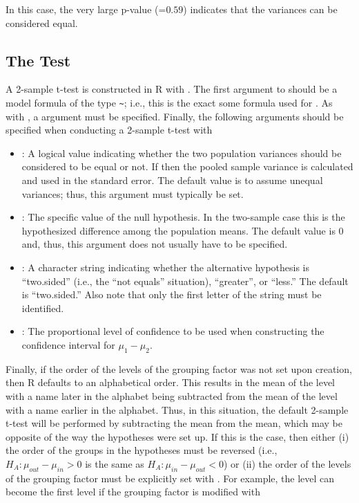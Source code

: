 \documentclass[10pt,openany]{book}\usepackage[]{graphicx}\usepackage[]{color}
\begin{document}
In this case, the very large p-value (=$0.59$) indicates that the variances can be considered equal.


\subsection{The Test}
A 2-sample t-test is constructed in R with .  The first argument to  should be a model formula of the type \verb"~"; i.e., this is the exact some formula used for .  As with , a  argument must be specified.  Finally, the following arguments should be specified when conducting a 2-sample t-test with 
\begin{itemize}
  \item {}: A logical value indicating whether the two population variances should be considered to be equal or not.  If  then the pooled sample variance is calculated and used in the standard error.  The default value is to assume unequal variances; thus, this argument must typically be set.
  \item {}: The specific value of the null hypothesis.  In the two-sample case this is the hypothesized difference among the population means.  The default value is $0$ and, thus, this argument does not usually have to be specified.
  \item {}: A character string indicating whether the alternative hypothesis is ``two.sided'' (i.e., the ``not equals'' situation), ``greater'', or ``less.''  The default is ``two.sided.''  Also note that only the first letter of the string must be identified.
  \item {}: The proportional level of confidence to be used when constructing the confidence interval for $\mu_{1}-\mu_{2}$.
\end{itemize}


Finally, if the order of the levels of the grouping factor was not set upon creation, then R defaults to an alphabetical order.  This results in the mean of the level with a name later in the alphabet being subtracted from the mean of the level with a name earlier in the alphabet.  Thus, in this situation, the default 2-sample t-test will be performed by subtracting the  mean from the  mean, which may be opposite of the way the hypotheses were set up.  If this is the case, then either (i) the order of the groups in the hypotheses must be reversed (i.e., $H_{A}:\mu_{out}-\mu_{in}>0$ is the same as $H_{A}:\mu_{in}-\mu_{out}<0$) or (ii) the order of the levels of the grouping factor must be explicitly set with .  For example, the  level can become the first level if the  grouping factor is modified with
\end{document}
